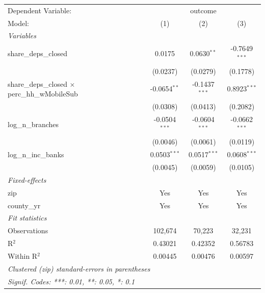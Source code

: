 \begingroup
\centering
\begin{tabular}{lccc}
   \tabularnewline \midrule \midrule
   Dependent Variable: & \multicolumn{3}{c}{outcome}\\
   Model:                                                 & (1)             & (2)             & (3)\\  
   \midrule
   \emph{Variables}\\
   share\_deps\_closed                                    & 0.0175          & 0.0630$^{**}$   & -0.7649$^{***}$\\   
                                                          & (0.0237)        & (0.0279)        & (0.1778)\\   
   share\_deps\_closed $\times$ perc\_hh\_wMobileSub      & -0.0654$^{**}$  & -0.1437$^{***}$ & 0.8923$^{***}$\\   
                                                          & (0.0308)        & (0.0413)        & (0.2082)\\   
   log\_n\_branches                                       & -0.0504$^{***}$ & -0.0604$^{***}$ & -0.0662$^{***}$\\   
                                                          & (0.0046)        & (0.0061)        & (0.0119)\\   
   log\_n\_inc\_banks                                     & 0.0503$^{***}$  & 0.0517$^{***}$  & 0.0608$^{***}$\\   
                                                          & (0.0045)        & (0.0059)        & (0.0105)\\   
   \midrule
   \emph{Fixed-effects}\\
   zip                                                    & Yes             & Yes             & Yes\\  
   county\_yr                                             & Yes             & Yes             & Yes\\  
   \midrule
   \emph{Fit statistics}\\
   Observations                                           & 102,674         & 70,223          & 32,231\\  
   R$^2$                                                  & 0.43021         & 0.42352         & 0.56783\\  
   Within R$^2$                                           & 0.00445         & 0.00476         & 0.00597\\  
   \midrule \midrule
   \multicolumn{4}{l}{\emph{Clustered (zip) standard-errors in parentheses}}\\
   \multicolumn{4}{l}{\emph{Signif. Codes: ***: 0.01, **: 0.05, *: 0.1}}\\
\end{tabular}
\par\endgroup
